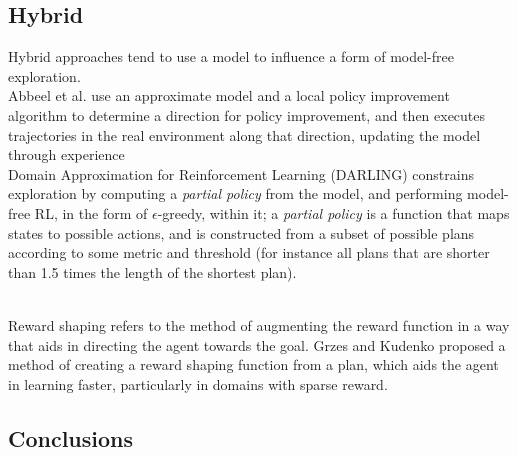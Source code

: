 \subsection{Hybrid}
Hybrid approaches tend to use a model to influence a form of model-free exploration.
\\ Abbeel et al. \cite{10.1145/1143844.1143845} use an approximate model and a local policy improvement algorithm to determine a  direction for policy improvement, and then executes trajectories in the real environment along that direction, updating the model through experience
\\Domain Approximation for Reinforcement Learning (DARLING) \cite{AIJ16-leonetti} constrains exploration by computing a \textit{partial policy} from the model, and performing model-free RL, in the form of $\epsilon$-greedy, within it; a \textit{partial policy} is a function that maps states to possible actions, and is constructed from a subset of possible plans according to some metric and threshold (for instance all plans that are shorter than 1.5 times the length of the shortest plan). 



\\ Reward shaping refers to the method of augmenting the reward function in a way that aids in directing the agent towards the goal. Grzes and Kudenko proposed a method \cite{4670492} of creating a reward shaping function from a plan, which aids the agent in learning faster, particularly in domains with sparse reward.
 


\subsection{Conclusions}



